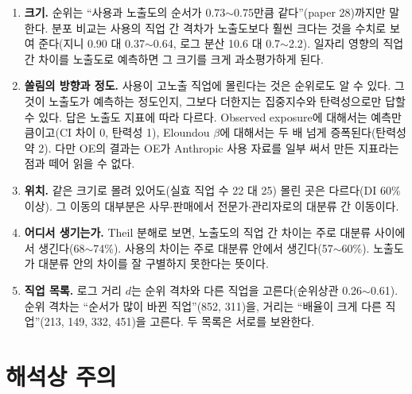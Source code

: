 \documentclass[11pt]{article}
\begin{document}
\begin{enumerate}[leftmargin=*]
  \item \textbf{크기.} 순위는 ``사용과 노출도의 순서가 0.73$\sim$0.75만큼 같다''(paper 28)까지만 말한다. 분포 비교는 사용의 직업 간 격차가 노출도보다 훨씬 크다는 것을 수치로 보여 준다(지니 0.90 대 0.37$\sim$0.64, 로그 분산 10.6 대 0.7$\sim$2.2). 일자리 영향의 직업 간 차이를 노출도로 예측하면 그 크기를 크게 과소평가하게 된다.
  \item \textbf{쏠림의 방향과 정도.} 사용이 고노출 직업에 몰린다는 것은 순위로도 알 수 있다. 그것이 노출도가 예측하는 정도인지, 그보다 더한지는 집중지수와 탄력성으로만 답할 수 있다. 답은 노출도 지표에 따라 다르다. Observed exposure에 대해서는 예측만큼이고(CI 차이 0, 탄력성 1), Eloundou $\beta$에 대해서는 두 배 넘게 증폭된다(탄력성 약 2). 다만 OE의 결과는 OE가 Anthropic 사용 자료를 일부 써서 만든 지표라는 점과 떼어 읽을 수 없다.
  \item \textbf{위치.} 같은 크기로 몰려 있어도(실효 직업 수 22 대 25) 몰린 곳은 다르다(DI 60\% 이상). 그 이동의 대부분은 사무$\cdot$판매에서 전문가$\cdot$관리자로의 대분류 간 이동이다.
  \item \textbf{어디서 생기는가.} Theil 분해로 보면, 노출도의 직업 간 차이는 주로 대분류 사이에서 생긴다(68$\sim$74\%). 사용의 차이는 주로 대분류 안에서 생긴다(57$\sim$60\%). 노출도가 대분류 안의 차이를 잘 구별하지 못한다는 뜻이다.
  \item \textbf{직업 목록.} 로그 거리 $d$는 순위 격차와 다른 직업을 고른다(순위상관 0.26$\sim$0.61). 순위 격차는 ``순서가 많이 바뀐 직업''(852, 311)을, 거리는 ``배율이 크게 다른 직업''(213, 149, 332, 451)을 고른다. 두 목록은 서로를 보완한다.
\end{enumerate}

\section{해석상 주의}
\end{document}
